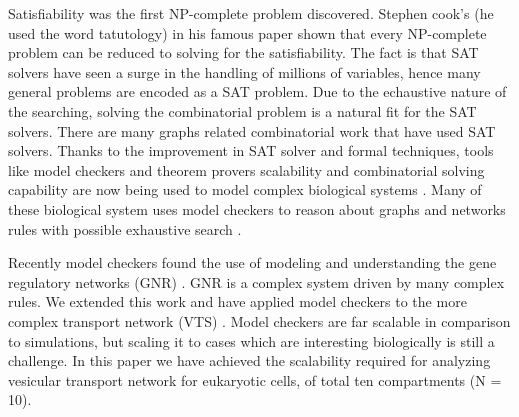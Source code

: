 Satisfiability was the first NP-complete problem discovered. Stephen cook's (he used the word tatutology) \cite{cook1971complexity} in his famous paper shown that every NP-complete problem can be reduced to solving for the satisfiability. The fact is that SAT solvers have seen a surge in the handling of millions of variables, hence many general problems are encoded as a SAT problem. Due to the echaustive nature of the searching, solving the combinatorial problem is a natural fit for the SAT solvers. There are many graphs related combinatorial work \cite{gay2013solving,wotzlaw2012generalized} that have used SAT solvers. Thanks to the improvement in SAT solver and formal techniques, tools like model checkers and theorem provers scalability and combinatorial solving capability are now being used to model complex biological systems \cite{heule2010exact,yordanov2013smt,mangla2010timing}.
Many of these biological system uses model checkers to reason about graphs and networks rules with possible exhaustive search \cite{guerra2012reasoning,chin2008biographe}.  

Recently model checkers found the use of modeling and understanding the gene regulatory networks (GNR) \cite{giacobbe2015model,rosenblueth2014inference, batt2010efficient}. GNR is a complex system driven by many complex rules. We extended this work and have applied model checkers to the more complex transport network (VTS) \cite{mani2016stacking}. Model checkers are far scalable in comparison to simulations, but scaling it to cases which are interesting biologically is still a challenge. In this paper we have achieved the scalability required for analyzing vesicular transport network for eukaryotic cells, of total ten compartments (N = 10). \\


